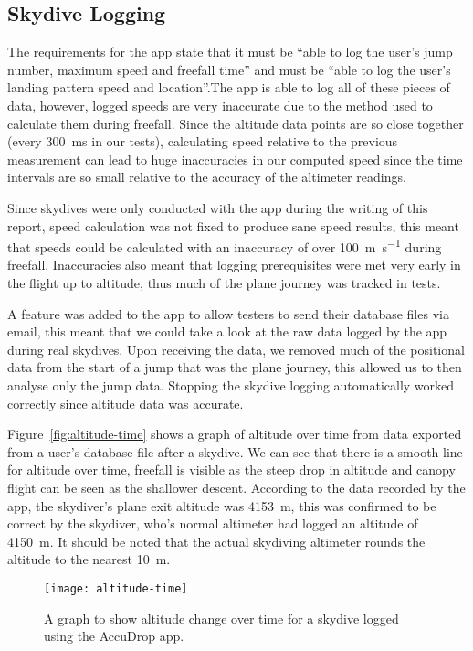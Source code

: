 \subsection{Skydive Logging}\label{subsec:skydive-logging}
The requirements for the app state that it must be ``able to log the user's jump number, maximum speed and freefall time'' and must be ``able to log the user's landing pattern speed and location''.The app is able to log all of these pieces of data, however, logged speeds are very inaccurate due to the method used to calculate them during freefall. Since the altitude data points are so close together (every \SI{300}{\milli\second} in our tests), calculating speed relative to the previous measurement can lead to huge inaccuracies in our computed speed since the time intervals are so small relative to the accuracy of the altimeter readings.

Since skydives were only conducted with the app during the writing of this report, speed calculation was not fixed to produce sane speed results, this meant that speeds could be calculated with an inaccuracy of over \SI{100}{\metre\per\second} during freefall. Inaccuracies also meant that logging prerequisites were met very early in the flight up to altitude, thus much of the plane journey was tracked in tests.

A feature was added to the app to allow testers to send their database files via email, this meant that we could take a look at the raw data logged by the app during real skydives. Upon receiving the data, we removed much of the positional data from the start of a jump that was the plane journey, this allowed us to then analyse only the jump data. Stopping the skydive logging automatically worked correctly since altitude data was accurate.

Figure~\vref{fig:altitude-time} shows a graph of altitude over time from data exported from a user's database file after a skydive. We can see that there is a smooth line for altitude over time, freefall is visible as the steep drop in altitude and canopy flight can be seen as the shallower descent. According to the data recorded by the app, the skydiver's plane exit altitude was \SI{4153}{\metre}, this was confirmed to be correct by the skydiver, who's normal altimeter had logged an altitude of \SI{4150}{\metre}. It should be noted that the actual skydiving altimeter rounds the altitude to the nearest \SI{10}{\metre}.

\begin{figure}[ht]
  \centering
  \texttt{[image: altitude-time]}
  \caption{A graph to show altitude change over time for a skydive logged using the AccuDrop app.}\label{fig:altitude-time}
\end{figure}

